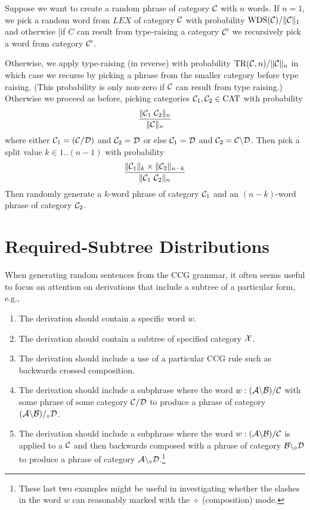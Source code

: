 \documentclass[10pt]{article}
\begin{document}
Suppose we want to create a random phrase of category ${\cal C}$ with $n$ words.
If $n = 1$, we pick a random word from $LEX$ of category ${\cal C}$ with probability \( \mbox{WDS}({\cal C}) / \|{\cal C}\|_1\) and otherwise [if $C$ can result from type-raising a category ${\cal C}'$ we recursively pick a word from category ${\cal C}'$.

Otherwise, we apply type-raising (in reverse) with probability
\(\mbox{TR}({\cal C},n) / \|{\cal C}\|_n\) in which case we recurse by picking a phrase from the smaller category before type raising. (This probability is only non-zero if ${\cal C}$ can result from type raising.) Otherwise we proceed as before, picking
categories \({\cal C}_1,{\cal C}_2\in\mbox{CAT}\) with probability
\[
\frac{\|{\cal C}_1\ {\cal C}_2\|_n}{\|{\cal C}\|_n}
\]
where either ${\cal C}_1 = ({\cal C}/{\cal D})$ and ${\cal C}_2 = {\cal D}$ or else \({\cal C}_1={\cal D}\) and \({\cal C}_2= {\cal C}\backslash{\cal D}\). Then pick a split value $k\in 1..(n-1)$ with probability
\[
    \frac{\|\C_1\|_k\times\|\C_2\|_{n{-}k}}{\|\C_1\ \C_2\|_n}
  \]
  Then randomly generate a $k$-word phrase of category \({\cal C}_1\) and an \((n{-}k)\)-word phrase of category \({\cal C}_2\).

\section{Required-Subtree Distributions}

When generating random sentences from the CCG grammar, it often seems useful to focus on attention on derivations that include a subtree of a particular form, e.g.,

\begin{enumerate}
    \item The derivation should contain a specific word $w$.
    \item The derivation should contain a subtree of specified category ${\cal X}$.
    \item The derivation should include a use of a particular CCG rule such as backwards crossed composition.
    \item The derivation should include a subphrase where the word $w : ({\cal A}\backslash {\cal B})/{\cal C}$ with some phrase of some category ${\cal C}/{\cal D}$ to produce a phrase of category $({\cal A}\backslash {\cal B})/_\diamond{\cal D}$.
    \item The derivation should include a subphrase where the word $w : ({\cal A}\backslash {\cal B})/{\cal C}$ is applied to a ${\cal C}$ and then backwards composed with a phrase of category ${\cal B}\backslash_{\diamond}{\cal D}$ to produce a phrase of category ${\cal A}\backslash_{\diamond}{\cal D}$.\footnote{These last two examples might be useful in investigating whether the slashes in the word $w$ can reasonably marked with the $\diamond$ (composition) mode.}
\end{enumerate}
\end{document}
